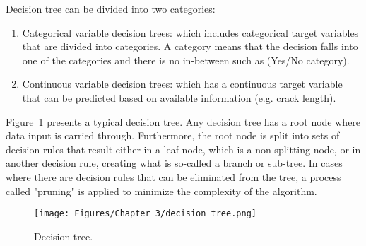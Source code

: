 Decision tree can be divided into two categories:
\begin{enumerate}
	\item Categorical variable decision trees: which includes categorical target variables that are divided into categories. A category means that the decision falls into one of the categories and there is no in-between such as (Yes/No category).
	\item Continuous variable decision trees: which has a continuous target variable that can be predicted based on available information (e.g. crack length).
\end{enumerate}
Figure~\ref{fig:Decision_tree} presents a typical decision tree.
Any decision tree has a root node where data input is carried through.
Furthermore, the root node is split into sets of decision rules that result either in a leaf node, which is a non-splitting node, or in another decision rule, creating what is so-called a branch or sub-tree.
In cases where there are decision rules that can be eliminated from the tree, a process called "pruning" is applied to minimize the complexity of the algorithm.
\begin{figure}[!ht]
	\begin{center}
		\texttt{[image: Figures/Chapter\_3/decision\_tree.png]}
	\end{center}
	\caption{Decision tree.}
	\label{fig:Decision_tree}
\end{figure} 